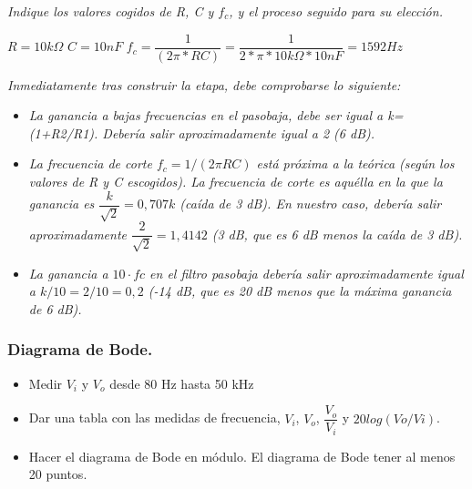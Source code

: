 \documentclass[paper=a4, fontsize=11pt]{scrartcl} %
\numberwithin{equation}{section} %
\numberwithin{figure}{section} %
\numberwithin{table}{section} %
\begin{document}
\newpage

\textit{Indique los valores cogidos de R, C y $f_{c}$, y el proceso seguido para su elección.} \newline

$ R = 10 k \Omega $ \newline
$ C = 10 nF $ \newline
$ f_{c}=\dfrac{1}{(2 \pi * RC)} = \dfrac{1}{2 * \pi * 10 k \Omega * 10 nF} = 1592Hz$ \newline

\textit{Inmediatamente tras construir la etapa, debe comprobarse lo siguiente:}

\begin{itemize}
	\item \textit{La ganancia a bajas frecuencias en el pasobaja, debe ser igual a k=(1+R2/R1). Debería salir aproximadamente igual a 2 (6 dB).}
	\item \textit{La frecuencia de corte $ f_{c}=1/(2 \pi RC) $ está próxima a la teórica (según los valores de R y C escogidos). La frecuencia de corte es aquélla en la que la ganancia es $ \dfrac{k}{\sqrt{2}} =0,707k $ (caída de 3 dB). En nuestro caso, debería salir aproximadamente $ \dfrac{2}{\sqrt{2}}=1,4142 $ (3 dB, que es 6 dB menos la caída de 3 dB).}
	\item \textit{La ganancia a $ 10·fc $ en el filtro pasobaja debería salir aproximadamente igual a $ k/10=2/10=0,2 $ (-14 dB, que es 20 dB menos que la máxima ganancia de 6 dB).}
\end{itemize} \newpage

\subsubsection{Diagrama de Bode.}

\begin{itemize}
	\item Medir $ V_{i} $ y $ V_{o} $ desde 80 Hz hasta 50 kHz 
	\item Dar una tabla con las medidas de frecuencia, $ V_{i} $, $ V_{o} $, $ \dfrac{V_{o}}{V_{i}} $ y $ 20log(Vo/Vi) $.
	\item Hacer el diagrama de Bode en módulo. El diagrama de Bode tener al menos 20 puntos.
\end{itemize}
\end{document}
